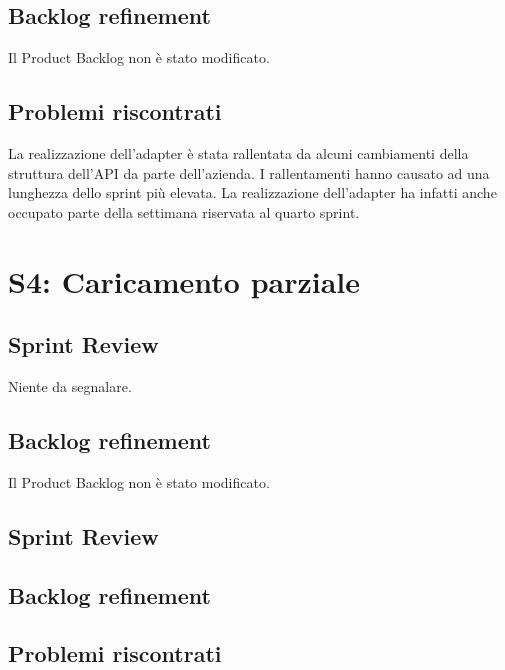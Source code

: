 \subsection{Backlog refinement}
Il Product Backlog non è stato modificato.

\subsection{Problemi riscontrati}
La realizzazione dell'adapter è stata rallentata da alcuni cambiamenti della struttura dell'API da parte dell'azienda. I rallentamenti hanno causato ad una lunghezza dello sprint più elevata. La realizzazione dell'adapter ha infatti anche occupato parte della settimana riservata al quarto sprint.

\newpage

\section{S4: Caricamento parziale}
\subsection{Sprint Review}
Niente da segnalare.

\subsection{Backlog refinement}
Il Product Backlog non è stato modificato.

\subsection{Sprint Review}
\subsection{Backlog refinement}
\subsection{Problemi riscontrati}

